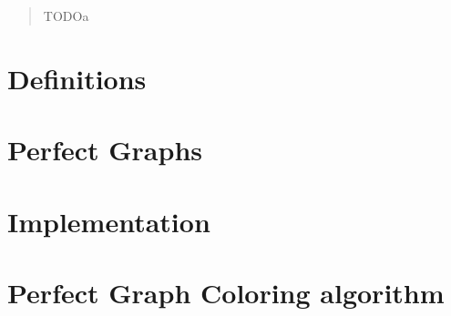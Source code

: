 \documentclass{report}
\author{Adrian Siwiec}
\date{\today{}}
\begin{document}

\pagebreak

\begin{abstract}
	TODOa
\end{abstract}

\listoftheorems[ignoreall,show={defn}]
\tableofcontents

\pagebreak

\chapter*{Definitions}


\chapter{Perfect Graphs}



\chapter{Implementation}


\appendix
\appendixpage
\addappheadtotoc

\chapter{Perfect Graph Coloring algorithm}
\label{ch:coloringSquareFree}
% 


% 
\printbibliography
\end{document}
